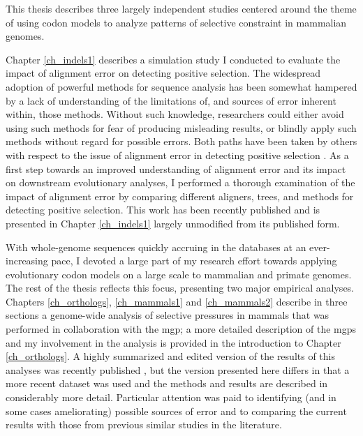 This thesis describes three largely independent studies centered
around the theme of using codon models to analyze patterns of
selective constraint in mammalian genomes.

Chapter \ref{ch_indels1} describes a simulation study I conducted to
evaluate the impact of alignment error on detecting \sw positive
selection. The widespread adoption of powerful methods for sequence
analysis has been somewhat hampered by a lack of understanding of the
limitations of, and sources of error inherent within, those
methods. Without such knowledge, researchers could either avoid using
such methods for fear of producing misleading results, or blindly
apply such methods without regard for possible errors. Both paths have
been taken by others with respect to the issue of alignment error in
detecting positive selection
\citep{Thompson1994,Bakewell2007,Studer2008,MarkovaRaina2011}. As a
first step towards an improved understanding of alignment error and
its impact on downstream evolutionary analyses, I performed a thorough
examination of the impact of alignment error by comparing different
aligners, trees, and methods for detecting positive selection. This
work has been recently published \citep{Jordan2011} and is presented
in Chapter \ref{ch_indels1} largely unmodified from its published
form.

With whole-genome sequences quickly accruing in the databases at an
ever-increasing pace, I devoted a large part of my research effort
towards applying evolutionary codon models on a large scale to
mammalian and primate genomes. The rest of the thesis reflects this
focus, presenting two major empirical analyses. Chapters
\ref{ch_orthologs}, \ref{ch_mammals1} and \ref{ch_mammals2} describe
in three sections a genome-wide analysis of \sw selective pressures in
mammals that was performed in collaboration with the \acf{mgp}; a more
detailed description of the \acp{mgp} and my involvement in the
analysis is provided in the introduction to Chapter
\ref{ch_orthologs}. A highly summarized and edited version of the
results of this analyses was recently published
\citep{LindbladToh2011}, but the version presented here differs in
that a more recent dataset was used and the methods and results are
described in considerably more detail. Particular attention was paid
to identifying (and in some cases ameliorating) possible sources of
error and to comparing the current results with those from previous
similar studies in the literature.

